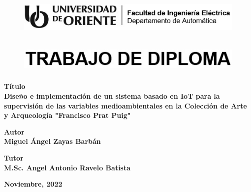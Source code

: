 \thispagestyle{empty}


\begin{figure}[h]
    \centering
    \includegraphics[width=15cm, height=2cm]{imagenes/identidad en blanco y negro.jpg}
\end{figure}

\vspace{1cm}

\begin{figure}[h]
    \centering
    \includegraphics[width=14cm, height=1.5cm]{imagenes/trabajo de diploma}
\end{figure}

\vspace{1cm}

\begin{center}
    \textbf{\large
        Título\\
        Diseño e implementación de un sistema basado en IoT para la supervisión de las variables medioambientales en la Colección de Arte y Arqueología "Francisco Prat Puig"}
    \vspace{0.5cm}

    \textbf{\large Autor\\
    Miguel Ángel Zayas Barbán}
    \vspace{0.5cm}

    \textbf{\large Tutor\\
    M.Sc. Angel Antonio Ravelo Batista}

    \vfill
    \textbf{\large Noviembre, 2022}   
\end{center}

 
